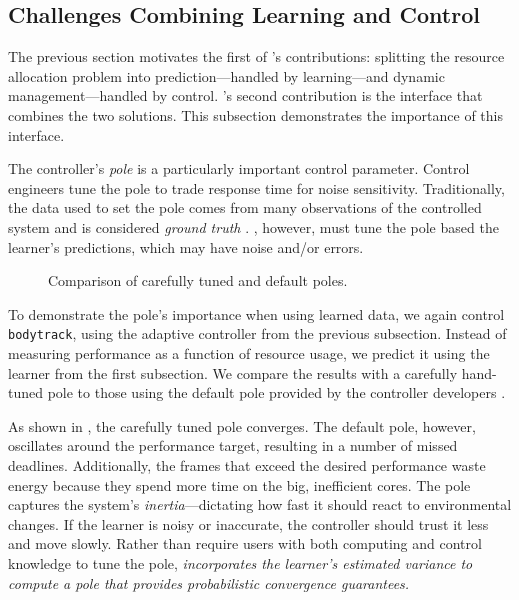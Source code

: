 \subsection{Challenges Combining Learning and Control}
The previous section motivates the first of \SYSTEM{}'s contributions:
splitting the resource allocation problem into prediction---handled by
learning---and dynamic management---handled by control. \SYSTEM{}'s
second contribution is the interface that combines the two solutions.
This subsection demonstrates the importance of this interface.

The controller's \emph{pole} is a particularly important control
parameter.  Control engineers tune the pole to trade response time for
noise sensitivity.  Traditionally, the data used to set the pole comes
from many observations of the controlled system and is considered
\emph{ground truth} \cite{Hellerstein2004a}.  \SYSTEM{}, however, must
tune the pole based the learner's predictions, which may have noise
and/or errors.


\begin{figure} 

\caption{Comparison of carefully tuned and default poles.}
\label{fig:not-simple}
\end{figure}
To demonstrate the pole's importance when using learned data, we again
control \texttt{bodytrack}, using the adaptive controller from the
previous subsection. Instead of measuring performance as a function of
resource usage, we predict it using the learner from the first
subsection.  We compare the results with a carefully hand-tuned pole
to those using the default pole provided by the controller developers
\cite{POET}.

As shown in , the carefully tuned pole
converges. The default pole, however, oscillates around the
performance target, resulting in a number of missed deadlines.
Additionally, the frames that exceed the desired performance waste
energy because they spend more time on the big, inefficient cores. The
pole captures the system's \emph{inertia}---dictating how fast it
should react to environmental changes.  If the learner is noisy or
inaccurate, the controller should trust it less and move slowly.
Rather than require users with both computing and control knowledge to
tune the pole, \emph{\SYSTEM{} incorporates the learner's estimated
  variance to compute a pole that provides probabilistic convergence
  guarantees.}


